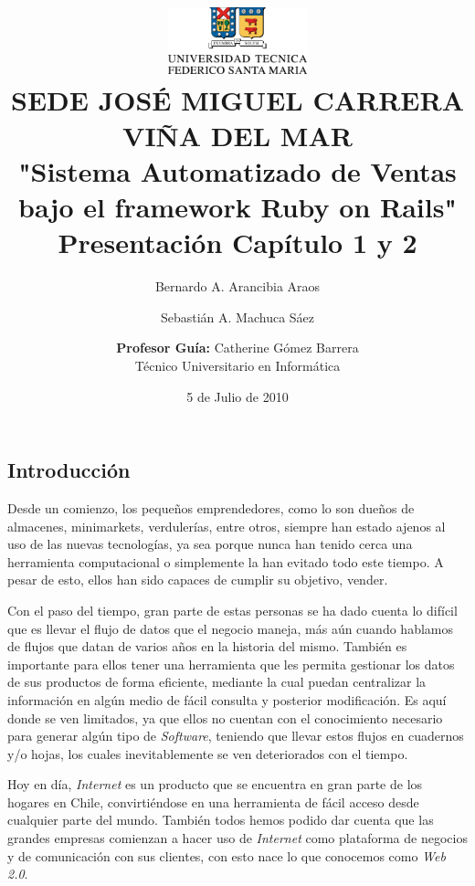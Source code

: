 \documentclass[letterpaper,12pt]{article}
\title{
    \vspace*{0.5cm}
    \includegraphics[width =0.3\textwidth]{images/utfsm.png}
    \\
        \tiny{SEDE JOSÉ MIGUEL CARRERA \\ VIÑA DEL MAR}
    \\ \vspace*{1cm}
    \Huge{"Sistema Automatizado de Ventas \\ bajo el framework Ruby on Rails"}
    \\ \large{Presentación Capítulo 1 y 2} %
}
\author{
    Bernardo A. Arancibia Araos
        \and
        Sebastián A. Machuca Sáez
        \and 
        \vspace*{1cm}
    \textbf{Profesor Guía:} Catherine Gómez Barrera 
        \\ \vspace*{1cm}
    Técnico Universitario en Informática
}
\date{5 de Julio de 2010}
\begin{document}
\def\tablename{Tabla}

\maketitle %
\thispagestyle{empty}
\newpage
\tableofcontents %
\thispagestyle{empty}
\newpage
\renewcommand{\listtablename}{Índice de tablas}
\listoftables
\thispagestyle{empty}
\newpage
\listoffigures 
\thispagestyle{empty}
\newpage

\setcounter{page}{1}


\setcounter{secnumdepth}{0}
\subsection{Introducción}

Desde un comienzo, los pequeños emprendedores, como lo son dueños de almacenes, minimarkets, verdulerías, entre 
otros, siempre han estado ajenos al uso de las nuevas tecnologías, ya sea porque nunca han tenido cerca una herramienta computacional 
o simplemente la han evitado todo este tiempo. A pesar de esto, ellos han sido capaces de cumplir su objetivo, vender. 

Con el paso del tiempo, gran parte de estas personas se ha dado cuenta lo difícil que 
es llevar el flujo de datos que el negocio maneja, más aún cuando hablamos de flujos que datan de 
varios años en la historia del mismo. También es importante para ellos tener una herramienta que les permita gestionar 
los datos de sus productos de forma eficiente, mediante la cual puedan centralizar la información en algún medio de 
fácil consulta y posterior modificación. Es aquí donde se ven limitados, ya que ellos no cuentan con el conocimiento necesario 
para generar algún tipo de \emph{Software}, teniendo que llevar estos flujos en cuadernos y/o hojas, los cuales inevitablemente 
se ven deteriorados con el tiempo. 

Hoy en día, \emph{Internet} es un producto que se encuentra en gran parte de los hogares en Chile, convirtiéndose en una herramienta
de fácil acceso desde cualquier parte del mundo. También todos hemos podido dar cuenta que las grandes empresas comienzan a 
hacer uso de \emph{Internet} como plataforma de negocios y de comunicación con sus clientes, con esto nace lo que conocemos como 
\emph{Web 2.0}.
\end{document}

